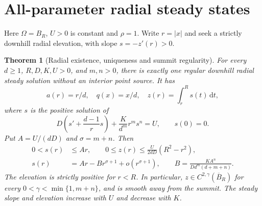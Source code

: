 \documentclass[11pt,a4paper]{article}
\newtheorem{theorem}{Theorem}[section]
\theoremstyle{definition}\newtheorem{definition}[theorem]{Definition}
\theoremstyle{remark}\newtheorem{remark}[theorem]{Remark}
\newcommand{\dd}{\,\mathrm d}
\newcommand{\cl}{\overline}
\begin{document}
\section{All-parameter radial steady states}
Here $\Omega=B_R$, $U>0$ is constant and $\rho=1$. Write $r=|x|$ and seek a strictly downhill radial elevation, with slope $s=-z'(r)>0$.

\begin{theorem}[Radial existence, uniqueness and summit regularity]\label{thm:radial}
For every $d\geq1$, $R,D,K,U>0$, and $m,n>0$, there is exactly one regular downhill radial steady solution without an interior point source. It has
\begin{equation}
 a(r)=r/d,\quad q(x)=x/d,\quad
 z(r)=\int_r^R s(t)\dd t,\label{eq:radialflux}
\end{equation}
where $s$ is the positive solution of
\begin{equation}
 D\left(s'+\frac{d-1}{r}s\right)+\frac K{d^m}r^m s^n=U,\qquad s(0)=0.\label{eq:slope}
\end{equation}
Put $A=U/(dD)$ and $\sigma=m+n$. Then
\begin{align}
 0<s(r)&\leq Ar,\qquad
 0\leq z(r)\leq\frac{U}{2dD}(R^2-r^2),\label{eq:radialbounds}\\
 s(r)&=Ar-Br^{\sigma+1}+o(r^{\sigma+1}),\qquad
 B=\frac{KA^n}{Dd^m(d+m+n)}.\label{eq:summit}
\end{align}
The elevation is strictly positive for $r<R$. In particular, $z\in C^{2,\gamma}(\cl B_R)$ for every $0<\gamma<\min\{1,m+n\}$, and is smooth away from the summit. The steady slope and elevation increase with $U$ and decrease with $K$.
\end{theorem}
\end{document}
